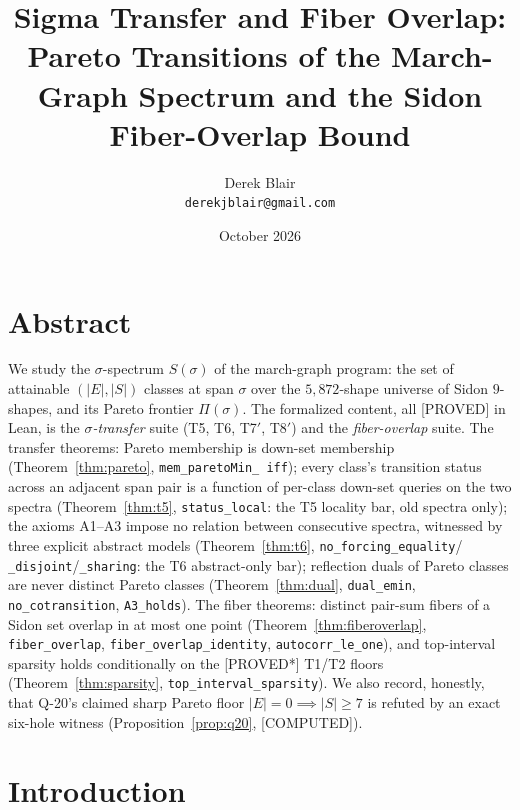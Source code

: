 \documentclass[11pt,a4paper]{article}
\title{Sigma Transfer and Fiber Overlap:\\
  Pareto Transitions of the March-Graph Spectrum and the Sidon
  Fiber-Overlap Bound}
\author{Derek Blair \\ \texttt{derekjblair@gmail.com}}
\date{October 2026}
\theoremstyle{definition}
\begin{document}
\maketitle

\section{Abstract}

We study the $\sigma$-spectrum $S(\sigma)$ of the march-graph program:
the set of attainable $(|E|,|S|)$ classes at span $\sigma$ over the
$5{,}872$-shape universe of Sidon $9$-shapes, and its Pareto frontier
$\Pi(\sigma)$. The formalized content, all [PROVED] in Lean, is the
\emph{$\sigma$-transfer} suite (T5, T6, T7$'$, T8$'$) and the
\emph{fiber-overlap} suite. The transfer theorems: Pareto membership is
down-set membership (Theorem~\ref{thm:pareto}, \texttt{mem\_paretoMin\_
iff}); every class's transition status across an adjacent span pair is a
function of per-class down-set queries on the two spectra
(Theorem~\ref{thm:t5}, \texttt{status\_local}: the T5 locality bar, old
spectra only); the axioms A1--A3 impose no relation between consecutive
spectra, witnessed by three explicit abstract models
(Theorem~\ref{thm:t6}, \texttt{no\_forcing\_equality}/
\texttt{\_disjoint}/\texttt{\_sharing}: the T6 abstract-only bar);
reflection duals of Pareto classes are never distinct Pareto classes
(Theorem~\ref{thm:dual}, \texttt{dual\_emin}, \texttt{no\_cotransition},
\texttt{A3\_holds}). The fiber theorems: distinct pair-sum fibers of a
Sidon set overlap in at most one point
(Theorem~\ref{thm:fiberoverlap}, \texttt{fiber\_overlap},
\texttt{fiber\_overlap\_identity}, \texttt{autocorr\_le\_one}), and
top-interval sparsity holds conditionally on the [PROVED*] T1/T2 floors
(Theorem~\ref{thm:sparsity}, \texttt{top\_interval\_sparsity}).
We also record, honestly, that Q-20's claimed sharp Pareto floor
$|E|=0\implies|S|\ge7$ is refuted by an exact six-hole witness
(Proposition~\ref{prop:q20}, [COMPUTED]).

\section{Introduction}
\end{document}
